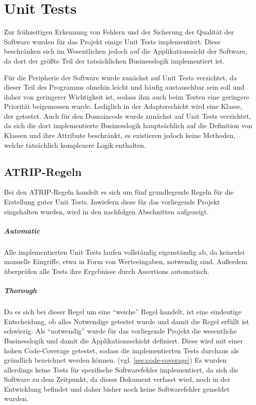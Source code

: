 \chapter{Unit Tests}
Zur frühzeitigen Erkennung von Fehlern und der Sicherung der Qualität der Software wurden für das Projekt einige Unit Tests implementiert. Diese beschränken sich im Wesentlichen jedoch auf die Applikationssicht der Software, da dort der größte Teil der tatsächlichen Businesslogik implementiert ist. 

Für die Peripherie der Software wurde zunächst auf Unit Tests verzichtet, da dieser Teil des Programms ohnehin leicht und häufig austauschbar sein soll und daher von geringerer Wichtigkeit ist, sodass ihm auch beim Testen eine geringere Priorität beigemessen wurde. Lediglich in der Adapterschicht wird eine Klasse, der  getestet. Auch für den Domaincode wurde zunächst auf Unit Tests verzichtet, da sich die dort implementierte Businesslogik hauptsächlich auf die Definition von Klassen und ihre Attribute beschränkt, es existieren jedoch keine Methoden, welche tatsächlich komplexere Logik enthalten.

\section{ATRIP-Regeln}
Bei den ATRIP-Regeln handelt es sich um fünf grundlegende Regeln für die Erstellung guter Unit Tests. Inwiefern diese für das vorliegende Projekt eingehalten wurden, wird in den nachfolgen Abschnitten aufgezeigt.

\paragraph{Automatic} Alle implementierten Unit Tests laufen vollständig eigenständig ab, da keinerlei manuelle Eingriffe, etwa in Form von Werteeingaben, notwendig sind. Außerdem überprüfen alle Tests ihre Ergebnisse durch Assertions automatisch.

\paragraph{Thorough} Da es sich bei dieser Regel um eine \enquote{weiche} Regel handelt, ist eine eindeutige Entscheidung, ob alles Notwendige getestet wurde und damit die Regel erfüllt ist schwierig. Als \enquote{notwendig} wurde für das vorliegende Projekt die wesentliche Businesslogik und damit die Applikationsschicht definiert. Diese wird mit einer hohen Code-Coverage getestet, sodass die implementierten Tests durchaus als gründlich bezeichnet werden können. (vgl. \autoref{sec:code-coverage}) Es wurden allerdings keine Tests für spezifische Softwarefehler implementiert, da sich die Software zu dem Zeitpunkt, da dieses Dokument verfasst wird, noch in der Entwicklung befindet und daher bisher noch keine Softwarefehler gemeldet wurden.

